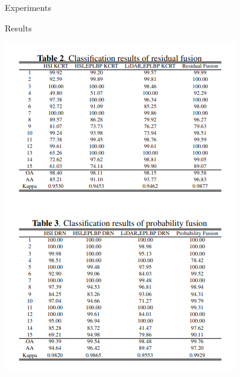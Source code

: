 \documentclass{beamer}
\begin{document}
\begin{frame}{Experiments}
    \begin{block}{Results}
    \begin{center}
        \includegraphics[scale=0.4]{tables}
    \end{center}
    \end{block}
\end{frame}
\end{document}
